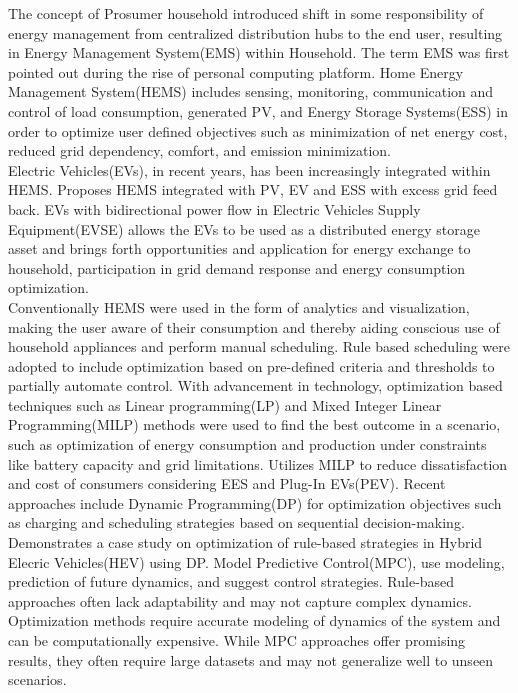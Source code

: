 \begin{large}
The concept of Prosumer household introduced shift in some responsibility of energy management from centralized distribution hubs to the end user, resulting in Energy Management System(EMS) within Household. The term EMS was first pointed out during the rise of personal computing platform\cite{sems}. Home Energy Management System(HEMS) includes sensing, monitoring, communication and control of load consumption, generated PV, and Energy Storage Systems(ESS) in order to optimize user defined objectives such as minimization of net energy cost, reduced grid dependency, comfort, and emission minimization. \\

Electric Vehicles(EVs), in recent years, has been increasingly integrated within HEMS. \cite{evess} Proposes HEMS integrated with PV, EV and ESS with excess grid feed back. EVs with bidirectional power flow in Electric Vehicles Supply Equipment(EVSE) allows the EVs to be used as a distributed energy storage asset and brings forth opportunities and application for energy exchange to household, participation in grid demand response and energy consumption optimization. \\


Conventionally HEMS were used in the form of analytics and visualization, making the user aware of their consumption and thereby aiding conscious use of household appliances and perform manual scheduling. Rule based scheduling were adopted to include optimization based on pre-defined criteria and thresholds to partially automate control. With advancement in technology, optimization based techniques such as Linear programming(LP) and Mixed Integer Linear Programming(MILP) methods were used to find the best outcome in a scenario, such as optimization of energy consumption and production under constraints like battery capacity and grid limitations. \cite{milp} Utilizes MILP to reduce dissatisfaction and cost of consumers considering EES and Plug-In EVs(PEV). Recent approaches include Dynamic Programming(DP) for optimization objectives such as charging and scheduling strategies based on sequential decision-making. \cite{dphev} Demonstrates a case study on optimization of rule-based strategies in Hybrid Elecric Vehicles(HEV) using DP. Model Predictive Control(MPC), use modeling, prediction of future dynamics, and suggest control strategies. Rule-based approaches often lack adaptability and may not capture complex dynamics. Optimization methods require accurate modeling of dynamics of the system and can be computationally expensive. While MPC approaches offer promising results, they often require large datasets and may not generalize well to unseen scenarios.


\end{large}
